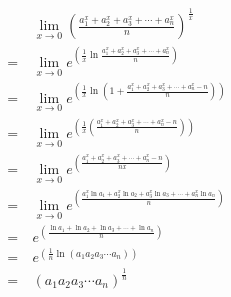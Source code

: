 \documentclass{article}
\begin{document}
	\large
	\setlength{\baselineskip}{3em}
	
	\begin{align*}
		&\ \lim_{x \to 0} \left( \frac{a_1^x + a_2^x + a_3^x + \cdots + a_n^x}{n} \right)^{\frac{1}{x}}
		\\
		= &\ \lim_{x \to 0} e^{\left( \frac{1}{x} \ln{\frac{a_1^x + a_2^x + a_3^x + \cdots + a_n^x}{n}} \right)}
		\\
		= &\ \lim_{x \to 0} e^{\left( \frac{1}{x} \ln{(1 + \frac{a_1^x + a_2^x + a_3^x + \cdots + a_n^x - n}{n})} \right)}
		\\
		= &\ \lim_{x \to 0} e^{\left( \frac{1}{x} (\frac{a_1^x + a_2^x + a_3^x + \cdots + a_n^x - n}{n}) \right)}
		\\
		= &\ \lim_{x \to 0} e^{\left( \frac{a_1^x + a_2^x + a_3^x + \cdots + a_n^x - n}{n x} \right)}
		\\
		= &\ \lim_{x \to 0} e^{\left( \frac{a_1^x \ln{a_1} + a_2^x \ln{a_2} + a_3^x \ln{a_3} + \cdots + a_n^x \ln{a_n}}{n} \right)}
		\\
		= &\ e^{\left( \frac{\ln{a_1} + \ln{a_2} + \ln{a_3} + \cdots + \ln{a_n}}{n} \right)}
		\\
		= &\ e^{\left( \frac{1}{n} \ln{(a_1 a_2 a_3 \cdots a_n)} \right)}
		\\
		= &\ (a_1 a_2 a_3 \cdots a_n)^{\frac{1}{n}}
	\end{align*}
\end{document}
